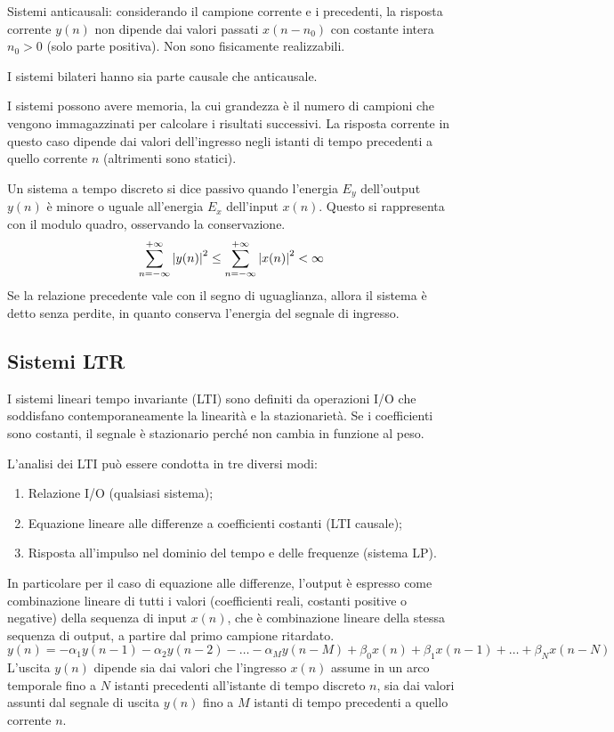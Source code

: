 Sistemi anticausali: considerando il campione corrente e i precedenti, la risposta corrente $y(n)$ non dipende dai valori passati $x(n - n_0)$ con costante intera $n_0 > 0$ (solo parte positiva). Non  sono fisicamente realizzabili.

I sistemi bilateri hanno sia parte causale che anticausale.

I sistemi possono avere memoria, la cui grandezza è il numero di campioni che vengono immagazzinati per calcolare i risultati successivi. La risposta corrente in questo caso dipende dai valori dell'ingresso negli istanti di tempo precedenti a quello corrente $n$ (altrimenti sono statici).

Un sistema a tempo discreto si dice passivo quando l'energia $E_y$ dell'output $y(n)$ è minore o uguale all'energia $E_x$ dell'input $x(n)$. Questo si rappresenta con il modulo quadro, osservando la conservazione. 
$$\sum_{n=-\infty}^{+\infty}\left|y(n)\right|^2 \leq \sum_{n=-\infty}^{+\infty}\left|x(n)\right|^2 < \infty$$
Se la relazione precedente vale con il segno di uguaglianza, allora il sistema è detto senza perdite, in quanto conserva l'energia del segnale di ingresso.

\subsection{Sistemi LTR}
I sistemi lineari tempo invariante (LTI) sono definiti da operazioni I/O che soddisfano contemporaneamente la linearità e la stazionarietà. Se i coefficienti sono costanti, il segnale è stazionario perché non cambia in funzione al peso.

L'analisi dei LTI può essere condotta in tre diversi modi:
\begin{enumerate}
	\item Relazione I/O (qualsiasi sistema);
	\item Equazione lineare alle differenze a coefficienti costanti (LTI causale);
	\item Risposta all'impulso nel dominio del tempo e delle frequenze (sistema LP).
\end{enumerate}

In particolare per il caso di equazione alle differenze, l'output è espresso come combinazione lineare di tutti i valori (coefficienti reali, costanti positive o negative) della sequenza di input $x(n)$, che è combinazione lineare della stessa sequenza di output, a partire dal primo campione ritardato. 
$$y(n) = -\alpha_1y(n-1) - \alpha_2y(n - 2) - \dots - \alpha_My(n - M) + \beta_0x(n) + \beta_1x(n - 1) + \dots + \beta_Nx(n - N)$$
L'uscita $y(n)$ dipende sia dai valori che l'ingresso $x(n)$ assume in un arco temporale fino a $N$ istanti precedenti all'istante di tempo discreto $n$, sia dai valori assunti dal segnale di uscita $y(n)$ fino a $M$ istanti di tempo precedenti a quello corrente $n$.

